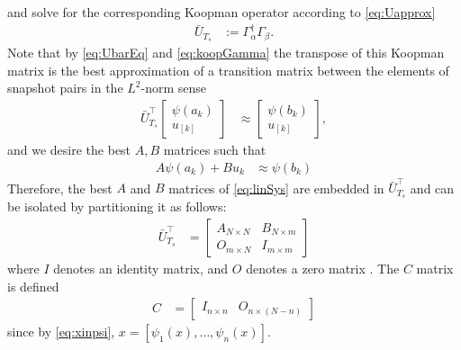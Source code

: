 and solve for the corresponding Koopman operator according to \eqref{eq:Uapprox}
\begin{align}
    \bar{U}_{T_s} &:= \Gamma_{\alpha}^\dagger \Gamma_\beta.
    \label{eq:koopGamma}
\end{align}
Note that by \eqref{eq:UbarEq} and \eqref{eq:koopGamma} the transpose of this Koopman matrix is the best approximation of a transition matrix between the elements of snapshot pairs in the $L^2$-norm sense 
\begin{align}
    \bar{U}_{T_s}^\top 
    \begin{bmatrix} \psi(a_k) \\ u_{[k]} \end{bmatrix} &\approx
    \begin{bmatrix} \psi(b_k) \\ u_{[k]} \end{bmatrix},
\end{align}
and we desire the best $A,B$ matrices such that
\begin{align}
    A \psi(a_k) + B u_k &\approx \psi(b_k)
    \label{eq:linSys_psi}
\end{align}
Therefore, the best $A$ and $B$ matrices of \eqref{eq:linSys} are embedded in $\bar{U}_{T_s}^\top$ and can be isolated by partitioning it as follows:
\begin{align}
    \bar{U}_{T_s}^\top &= 
    \begin{bmatrix} 
        A_{N \times N} &
        B_{N \times m} \\
        O_{m \times N} &
        I_{m \times m}
    \end{bmatrix}
    \label{eq:AB}
\end{align}
where $I$ denotes an identity matrix, and $O$ denotes a zero matrix .
The $C$ matrix is defined
\begin{align}
    C &= \begin{bmatrix} I_{n \times n} & O_{n \times (N-n)} \end{bmatrix}
\end{align}
since by \eqref{eq:xinpsi}, ${x = [ \psi_1(x) , \dots , \psi_n(x) ]}$.




